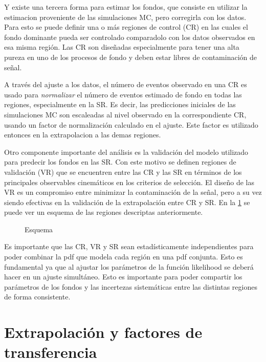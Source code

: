 Y existe una tercera forma para estimar los fondos, que consiste en utilizar la estimacion
proveniente de las simulaciones MC, pero corregirla con los datos. Para
esto se puede definir una o más regiones de control (CR) en las cuales el fondo dominante
pueda ser controlado comparadolo con los datos observados en esa misma región. Las CR
son diseñadas especialmente para tener una alta pureza en uno de los procesos de fondo
y deben estar libres de contaminación de señal.

A través del ajuste a los datos, el número de eventos observado en una CR es usado para
\emph{normalizar} el número de eventos estimado de fondo en todas las regiones, especialmente
en la SR. Es decir, las predicciones iniciales de las simulaciones MC son escaleadas al
nivel observado en la correspondiente CR, usando un factor de normalización calculado en
el ajuste. Este factor es utilizado entonces en la extrapolacion a las demas regiones.

Otro componente importante del análisis es la validación del modelo utilizado
para predecir los fondos en las SR. Con este motivo se definen regiones de validación
(VR) que se encuentren entre las CR y las SR en términos de los principales observables
cinemáticos en los criterios de selección. El diseño de las VR es un compromiso entre
minimizar la contaminación de la señal, pero a su vez siendo efectivas en la validación
de la extrapolación entre CR y SR. En la {\fig} \ref{fig:regions_sketch} se puede ver
un esquema de las regiones descriptas anteriormente.

\begin{figure}[h]
  \centering
  
  \caption{Esquema}
  \label{fig:regions_sketch}
\end{figure}

Es importante que las CR, VR y SR sean estadísticamente independientes para poder combinar
la pdf que modela cada región en una pdf conjunta. Esto es fundamental ya que al ajustar
los parámetros de la función likelihood se deberá hacer en un ajuste simultáneo. Esto es
importante para poder compartir los parámetros de los fondos y las incertezas sistemáticas
entre las distintas regiones de forma consistente.

\section{Extrapolación y factores de transferencia}

